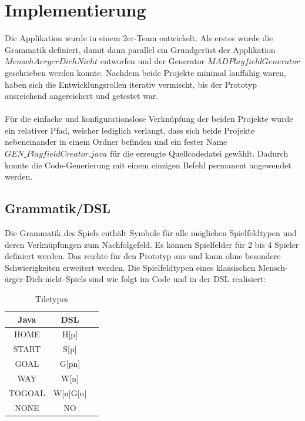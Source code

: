 \documentclass[conference]{IEEEtran}
\begin{document}
\section{Implementierung}
Die Applikation wurde in einem 2er-Team entwickelt. Als erstes wurde die Grammatik definiert, damit dann parallel
ein Grundger\"ust der Applikation $MenschAergerDichNicht$ entworfen und der Generator $MADPlayfieldGenerator$ geschrieben werden konnte. Nachdem beide Projekte minimal lauff\"ahig waren, haben sich die Entwicklungsrollen iterativ vermischt, bis der Prototyp ausreichend angereichert und getestet
war.
\\\\
F\"ur die einfache und konfigurationslose Verkn\"upfung der beiden Projekte wurde ein relativer Pfad, welcher lediglich verlangt, dass sich beide Projekte nebeneinander in einem Ordner befinden und ein fester Name $GEN\_PlayfieldCreator.java$ f\"ur die erzeugte Quellcodedatei gew\"ahlt.
Dadurch konnte die Code-Generierung mit einem einzigen Befehl permanent angewendet werden.

\subsection{Grammatik/DSL}
  Die Grammatik des Spiels enth\"alt Symbole f\"ur alle m\"oglichen Spielfeldtypen und deren Verkn\"upfungen zum Nachfolgefeld.
  Es k\"onnen Spielfelder f\"ur 2 bis 4 Spieler definiert werden. Das reichte f\"ur den Prototyp aus und kann ohne besondere
  Schwierigkeiten erweitert werden. Die Spielfeldtypen eines klassischen Mensch-\"arger-Dich-nicht-Spiels sind wie folgt im Code und in der DSL realisiert:

\begin{table}[h!]
  \centering
  \caption{Tiletypes}
  \label{tab:table1}
  \begin{tabular}{ccc}
    \toprule
    Java & DSL\\
    \midrule
    HOME & H[p]\\
    START & S[p]\\
    GOAL & G[pn] \\
    WAY & W[n] \\
    TOGOAL & W[n]G[n] \\
    NONE & NO \\
    \bottomrule
  \end{tabular}
\end{table}
\end{document}

